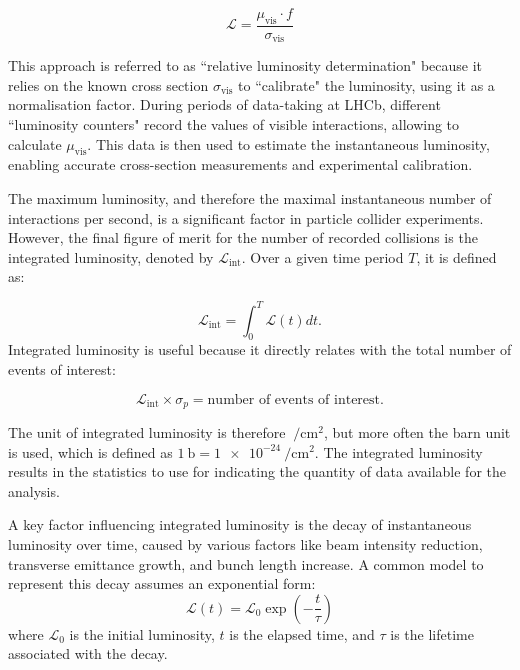 \begin{equation}\label{rel_lumi}
\mathcal{L} = \frac{\mu_{\text{vis}} \cdot f}{\sigma_{\text{vis}}}
\end{equation}

This approach is referred to as ``relative luminosity determination" because it relies on the known cross section $\sigma_{\text{vis}}$ to ``calibrate" the luminosity, using it as a normalisation factor. During periods of data-taking at LHCb, different ``luminosity counters" record the values of visible interactions, allowing to calculate $\mu_{\text{vis}}$. This data is then used to estimate the instantaneous luminosity, enabling accurate cross-section measurements and experimental calibration.


The maximum luminosity, and therefore the maximal instantaneous number of interactions per second, is a significant factor in particle collider experiments. However, the final figure of merit for the number of recorded collisions is the integrated luminosity, denoted by $\mathcal{L}_{\text{int}}$. Over a given time period $T$, it is defined as:

\begin{equation}
\mathcal{L}_{\text{int}} = \int_0^T \mathcal{L}(t) dt .
\end{equation}
Integrated luminosity is useful because it directly relates with the total number of events of interest:

\begin{equation}
\mathcal{L}_{\text{int}} \times \sigma_p = \text{number of events of interest}.
\end{equation}

The unit of integrated luminosity is therefore $\SI{}{\per\centi\meter\squared}$, but more often the barn unit is used, which is defined as $\SI{1}{\barn}=\SI{1e-24}{\per\centi\meter\squared}$. The integrated luminosity results in the statistics to use for indicating the quantity of data available for the analysis.

A key factor influencing integrated luminosity is the decay of instantaneous luminosity over time, caused by various factors like beam intensity reduction, transverse emittance growth, and bunch length increase. A common model to represent this decay assumes an exponential form:
\begin{equation}
\mathcal{L}(t) = \mathcal{L}_0 \exp\left( -\frac{t}{\tau} \right)
\end{equation}
where $\mathcal{L}_0$ is the initial luminosity, \(t\) is the elapsed time, and \(\tau\) is the lifetime associated with the decay. 

